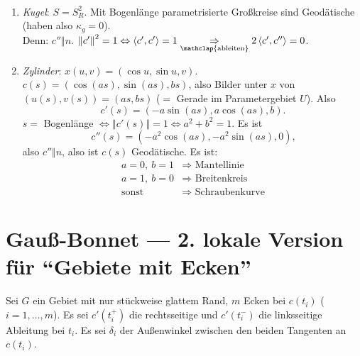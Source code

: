 \begin{example}[Geodätische]
  \
  \begin{enumerate}
    \item \emph{Kugel}: \( S = S_R^2 \). Mit Bogenlänge parametrisierte Großkreise sind Geodätische (haben also \( \kappa_g = 0 \)). \\
      Denn: \( c'' \Vert n \). \( \left\Vert c' \right\Vert^2 = 1 \Leftrightarrow \left\langle c', c' \right\rangle = 1 \underset{\mathclap{\text{ableiten}}}{\Rightarrow} 2\left\langle c', c'' \right\rangle = 0 \).
    
    \item \emph{Zylinder}: \( x(u,v) = \left( \cos u, \sin u, v \right) \). \\
      \( c(s) = \left( \cos(as),\sin(as),bs \right) \), also Bilder unter \( x \) von \( \left( u(s), v(s) \right) = (as, bs) \) (\( = \) Gerade im Parametergebiet \( U \)). Also
      \begin{equation*}
        c'(s) = \left( -a\sin (as), a\cos(as), b \right)\text{.}
      \end{equation*}
      \( s = \) Bogenlänge \( \Leftrightarrow \left\Vert c'(s) \right\Vert = 1 \Leftrightarrow a^2+b^2= 1 \). Es ist
      \begin{equation*}
        c''(s) = \left( -a^2\cos(as), -a^2\sin(as),0 \right)\text{,}
      \end{equation*}
      also \( c'' \Vert n \), also ist \( c(s) \) Geodätische. Es ist:
      \begin{align*}
        a = 0, \ b = 1 &\Rightarrow \text{ Mantellinie} \\
        a = 1, \ b = 0 &\Rightarrow \text{ Breitenkreis} \\
        \text{sonst } &\Rightarrow \text{ Schraubenkurve}
      \end{align*}
  \end{enumerate}
\end{example}

\section{Gauß-Bonnet --- 2. lokale Version für ``Gebiete mit Ecken''}

Sei \( G \) ein Gebiet mit nur stückweise glattem Rand, \( m \) Ecken bei \( c(t_i) \) (\( i = 1,\dots,m \)). Es sei \( c'(t_i^+) \) die rechtsseitige und \( c'(t_i^-) \) die linksseitige Ableitung bei \( t_i \). Es sei \( \delta_i \) der Außenwinkel zwischen den beiden Tangenten an \( c(t_i) \).

